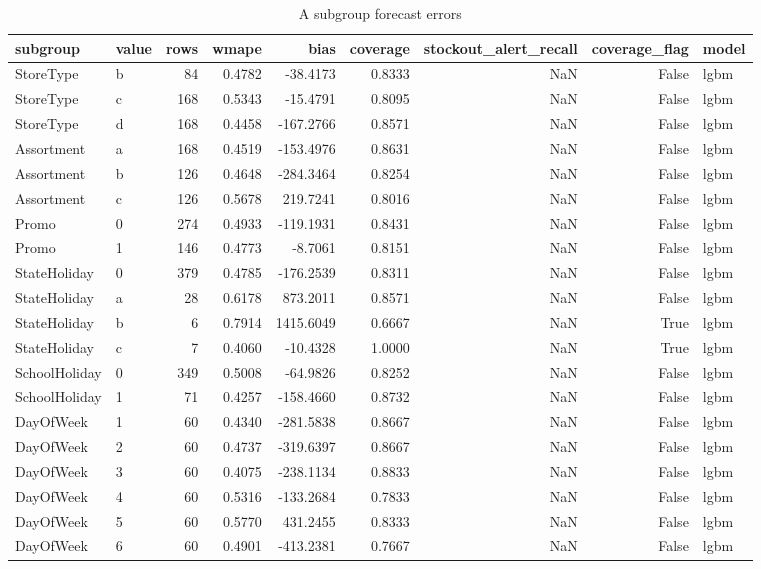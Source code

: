 \begin{table}
\caption{A subgroup forecast errors}
\label{tab:subgroup-errors-A}
\begin{tabular}{llrrrrrrl}
\toprule
subgroup & value & rows & wmape & bias & coverage & stockout\_alert\_recall & coverage\_flag & model \\
\midrule
StoreType & b & 84 & 0.4782 & -38.4173 & 0.8333 & NaN & False & lgbm \\
StoreType & c & 168 & 0.5343 & -15.4791 & 0.8095 & NaN & False & lgbm \\
StoreType & d & 168 & 0.4458 & -167.2766 & 0.8571 & NaN & False & lgbm \\
Assortment & a & 168 & 0.4519 & -153.4976 & 0.8631 & NaN & False & lgbm \\
Assortment & b & 126 & 0.4648 & -284.3464 & 0.8254 & NaN & False & lgbm \\
Assortment & c & 126 & 0.5678 & 219.7241 & 0.8016 & NaN & False & lgbm \\
Promo & 0 & 274 & 0.4933 & -119.1931 & 0.8431 & NaN & False & lgbm \\
Promo & 1 & 146 & 0.4773 & -8.7061 & 0.8151 & NaN & False & lgbm \\
StateHoliday & 0 & 379 & 0.4785 & -176.2539 & 0.8311 & NaN & False & lgbm \\
StateHoliday & a & 28 & 0.6178 & 873.2011 & 0.8571 & NaN & False & lgbm \\
StateHoliday & b & 6 & 0.7914 & 1415.6049 & 0.6667 & NaN & True & lgbm \\
StateHoliday & c & 7 & 0.4060 & -10.4328 & 1.0000 & NaN & True & lgbm \\
SchoolHoliday & 0 & 349 & 0.5008 & -64.9826 & 0.8252 & NaN & False & lgbm \\
SchoolHoliday & 1 & 71 & 0.4257 & -158.4660 & 0.8732 & NaN & False & lgbm \\
DayOfWeek & 1 & 60 & 0.4340 & -281.5838 & 0.8667 & NaN & False & lgbm \\
DayOfWeek & 2 & 60 & 0.4737 & -319.6397 & 0.8667 & NaN & False & lgbm \\
DayOfWeek & 3 & 60 & 0.4075 & -238.1134 & 0.8833 & NaN & False & lgbm \\
DayOfWeek & 4 & 60 & 0.5316 & -133.2684 & 0.7833 & NaN & False & lgbm \\
DayOfWeek & 5 & 60 & 0.5770 & 431.2455 & 0.8333 & NaN & False & lgbm \\
DayOfWeek & 6 & 60 & 0.4901 & -413.2381 & 0.7667 & NaN & False & lgbm \\

\end{tabular}
\end{table}

